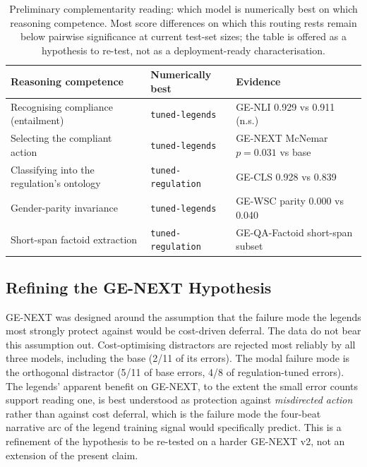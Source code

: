 \documentclass[pdflatex, sn-apa]{sn-jnl}%
\theoremstyle{thmstyleone}%
\theoremstyle{thmstyletwo}%
\theoremstyle{thmstylethree}%
\newcommand{\modellegends}{\texttt{tuned-legends}}
\newcommand{\modelreg}{\texttt{tuned-regulation}}
\begin{document}
\begin{table}[h]
\centering
\caption{Preliminary complementarity reading: which model is
numerically best on which reasoning competence. Most score differences
on which this routing rests remain below pairwise significance at
current test-set sizes; the table is offered as a hypothesis to
re-test, not as a deployment-ready characterisation.}
\label{tab:complementarity}
\small
\begin{tabular}{@{}lll@{}}
\toprule
Reasoning competence                          & Numerically best   & Evidence \\
\midrule
Recognising compliance (entailment)           & \modellegends      & GE-NLI 0.929 vs 0.911 (n.s.) \\
Selecting the compliant action                & \modellegends      & GE-NEXT McNemar $p=0.031$ vs base \\
Classifying into the regulation's ontology    & \modelreg          & GE-CLS 0.928 vs 0.839 \\
Gender-parity invariance                      & \modellegends      & GE-WSC parity 0.000 vs 0.040 \\
Short-span factoid extraction                 & \modelreg          & GE-QA-Factoid short-span subset \\
\bottomrule
\end{tabular}
\end{table}

\subsection{Refining the GE-NEXT Hypothesis}
\label{sec:disc:gnext_refinement}

GE-NEXT was designed around the assumption that the failure mode the
legends most strongly protect against would be cost-driven deferral.
The data do not bear this assumption out. Cost-optimising distractors
are rejected most reliably by all three models, including the base
(2/11 of its errors). The modal failure mode is the orthogonal
distractor (5/11 of base errors, 4/8 of regulation-tuned errors). The
legends' apparent benefit on GE-NEXT, to the extent the small error
counts support reading one, is best understood as protection against
\emph{misdirected action} rather than against cost deferral, which is
the failure mode the four-beat narrative arc of the legend training
signal would specifically predict. This is a refinement of the
hypothesis to be re-tested on a harder GE-NEXT v2, not an extension of
the present claim.
\end{document}

